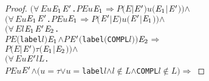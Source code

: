 \documentclass[GCNS]{yincog}
\renewcommand{\HOLConst}[1]{\texttt{#1}}
\renewcommand{\HOLBoundVar}[1]{\ensuremath{\mathit{#1}}}
\renewcommand{\HOLSymConst}[1]{#1}
\renewcommand{\HOLTokenConj}{\ensuremath{\wedge}}
\renewcommand{\HOLTokenForall}{\ensuremath{\forall \,}}
\renewcommand{\HOLTokenNotIn}{\ensuremath{\notin}}
\renewcommand{\HOLTokenDisj}{\ensuremath{\vee}}
\theoremstyle{remark}
\theoremstyle{theorem}
\theoremstyle{remark}
\renewcommand{\HOLTokenImp}{\ensuremath{\Longrightarrow}}
\begin{document}
\begin{proof}
\begin{alltt}
       \ensuremath{(}\HOLSymConst{\HOLTokenForall{}}\HOLBoundVar{E} \HOLBoundVar{u} \ensuremath{\HOLBoundVar{E}\sb{\mathrm{1}}} \ensuremath{\HOLBoundVar{E}\sp{\prime}}. \HOLBoundVar{P} \HOLBoundVar{E} \HOLBoundVar{u} \ensuremath{\HOLBoundVar{E}\sb{\mathrm{1}}} \HOLSymConst{\HOLTokenImp{}} \HOLBoundVar{P} \ensuremath{(}\HOLBoundVar{E} \HOLSymConst{\ensuremath{\mid}} \ensuremath{\HOLBoundVar{E}\sp{\prime}}\ensuremath{)} \HOLBoundVar{u} \ensuremath{(}\ensuremath{\HOLBoundVar{E}\sb{\mathrm{1}}} \HOLSymConst{\ensuremath{\mid}} \ensuremath{\HOLBoundVar{E}\sp{\prime}}\ensuremath{)}\ensuremath{)} \HOLSymConst{\HOLTokenConj{}}
       \ensuremath{(}\HOLSymConst{\HOLTokenForall{}}\HOLBoundVar{E} \HOLBoundVar{u} \ensuremath{\HOLBoundVar{E}\sb{\mathrm{1}}} \ensuremath{\HOLBoundVar{E}\sp{\prime}}. \HOLBoundVar{P} \HOLBoundVar{E} \HOLBoundVar{u} \ensuremath{\HOLBoundVar{E}\sb{\mathrm{1}}} \HOLSymConst{\HOLTokenImp{}} \HOLBoundVar{P} \ensuremath{(}\ensuremath{\HOLBoundVar{E}\sp{\prime}} \HOLSymConst{\ensuremath{\mid}} \HOLBoundVar{E}\ensuremath{)} \HOLBoundVar{u} \ensuremath{(}\ensuremath{\HOLBoundVar{E}\sp{\prime}} \HOLSymConst{\ensuremath{\mid}} \ensuremath{\HOLBoundVar{E}\sb{\mathrm{1}}}\ensuremath{)}\ensuremath{)} \HOLSymConst{\HOLTokenConj{}}
       \ensuremath{(}\HOLSymConst{\HOLTokenForall{}}\HOLBoundVar{E} \HOLBoundVar{l} \ensuremath{\HOLBoundVar{E}\sb{\mathrm{1}}} \ensuremath{\HOLBoundVar{E}\sp{\prime}} \ensuremath{\HOLBoundVar{E}\sb{\mathrm{2}}}.
            \HOLBoundVar{P} \HOLBoundVar{E} \ensuremath{(}\HOLConst{label} \HOLBoundVar{l}\ensuremath{)} \ensuremath{\HOLBoundVar{E}\sb{\mathrm{1}}} \HOLSymConst{\HOLTokenConj{}} \HOLBoundVar{P} \ensuremath{\HOLBoundVar{E}\sp{\prime}} \ensuremath{(}\HOLConst{label} \ensuremath{(}\HOLConst{COMPL} \HOLBoundVar{l}\ensuremath{)}\ensuremath{)} \ensuremath{\HOLBoundVar{E}\sb{\mathrm{2}}} \HOLSymConst{\HOLTokenImp{}}
            \HOLBoundVar{P} \ensuremath{(}\HOLBoundVar{E} \HOLSymConst{\ensuremath{\mid}} \ensuremath{\HOLBoundVar{E}\sp{\prime}}\ensuremath{)} \HOLSymConst{\ensuremath{\tau}} \ensuremath{(}\ensuremath{\HOLBoundVar{E}\sb{\mathrm{1}}} \HOLSymConst{\ensuremath{\mid}} \ensuremath{\HOLBoundVar{E}\sb{\mathrm{2}}}\ensuremath{)}\ensuremath{)} \HOLSymConst{\HOLTokenConj{}}
       \ensuremath{(}\HOLSymConst{\HOLTokenForall{}}\HOLBoundVar{E} \HOLBoundVar{u} \ensuremath{\HOLBoundVar{E}\sp{\prime}} \HOLBoundVar{l} \HOLBoundVar{L}.
            \HOLBoundVar{P} \HOLBoundVar{E} \HOLBoundVar{u} \ensuremath{\HOLBoundVar{E}\sp{\prime}} \HOLSymConst{\HOLTokenConj{}} \ensuremath{(}\HOLBoundVar{u} \HOLSymConst{\ensuremath{=}} \HOLSymConst{\ensuremath{\tau}} \HOLSymConst{\HOLTokenDisj{}} \HOLBoundVar{u} \HOLSymConst{\ensuremath{=}} \HOLConst{label} \HOLBoundVar{l} \HOLSymConst{\HOLTokenConj{}} \HOLBoundVar{l} \HOLSymConst{\HOLTokenNotIn{}} \HOLBoundVar{L} \HOLSymConst{\HOLTokenConj{}} \HOLConst{COMPL} \HOLBoundVar{l} \HOLSymConst{\HOLTokenNotIn{}} \HOLBoundVar{L}\ensuremath{)} \HOLSymConst{\HOLTokenImp{}}

\end{alltt}
\end{proof}
\end{document}
